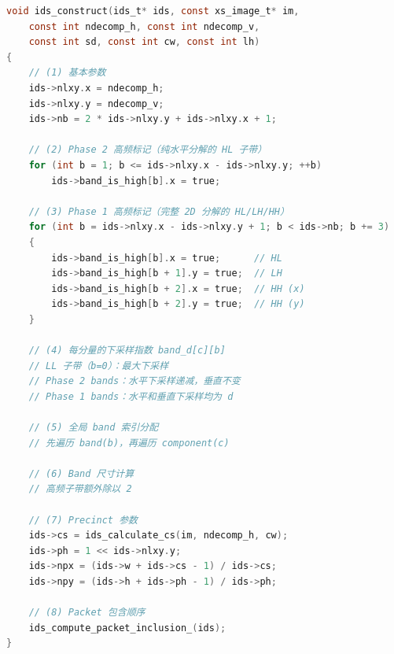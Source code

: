 \begin{lstlisting}[language=C,numbers=none]
void ids_construct(ids_t* ids, const xs_image_t* im,
    const int ndecomp_h, const int ndecomp_v,
    const int sd, const int cw, const int lh)
{
    // (1) 基本参数
    ids->nlxy.x = ndecomp_h;
    ids->nlxy.y = ndecomp_v;
    ids->nb = 2 * ids->nlxy.y + ids->nlxy.x + 1;

    // (2) Phase 2 高频标记（纯水平分解的 HL 子带）
    for (int b = 1; b <= ids->nlxy.x - ids->nlxy.y; ++b)
        ids->band_is_high[b].x = true;

    // (3) Phase 1 高频标记（完整 2D 分解的 HL/LH/HH）
    for (int b = ids->nlxy.x - ids->nlxy.y + 1; b < ids->nb; b += 3)
    {
        ids->band_is_high[b].x = true;      // HL
        ids->band_is_high[b + 1].y = true;  // LH
        ids->band_is_high[b + 2].x = true;  // HH (x)
        ids->band_is_high[b + 2].y = true;  // HH (y)
    }

    // (4) 每分量的下采样指数 band_d[c][b]
    // LL 子带（b=0）：最大下采样
    // Phase 2 bands：水平下采样递减，垂直不变
    // Phase 1 bands：水平和垂直下采样均为 d

    // (5) 全局 band 索引分配
    // 先遍历 band(b)，再遍历 component(c)

    // (6) Band 尺寸计算
    // 高频子带额外除以 2

    // (7) Precinct 参数
    ids->cs = ids_calculate_cs(im, ndecomp_h, cw);
    ids->ph = 1 << ids->nlxy.y;
    ids->npx = (ids->w + ids->cs - 1) / ids->cs;
    ids->npy = (ids->h + ids->ph - 1) / ids->ph;

    // (8) Packet 包含顺序
    ids_compute_packet_inclusion_(ids);
}
\end{lstlisting}

